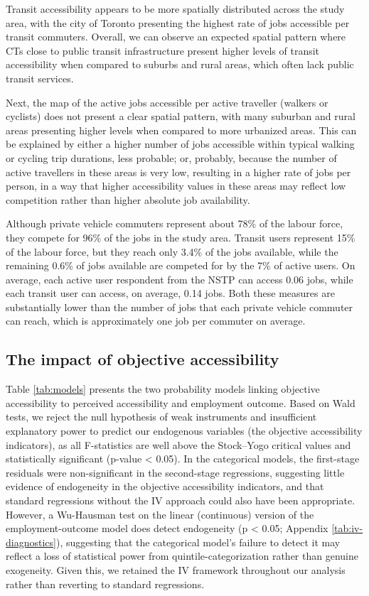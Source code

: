 \documentclass[preprint, 3p,
authoryear]{elsarticle} %
\begin{document}
Transit accessibility appears to be more spatially distributed across
the study area, with the city of Toronto presenting the highest rate of
jobs accessible per transit commuters. Overall, we can observe an
expected spatial pattern where CTs close to public transit
infrastructure present higher levels of transit accessibility when
compared to suburbs and rural areas, which often lack public transit
services.

Next, the map of the active jobs accessible per active traveller
(walkers or cyclists) does not present a clear spatial pattern, with
many suburban and rural areas presenting higher levels when compared to
more urbanized areas. This can be explained by either a higher number of
jobs accessible within typical walking or cycling trip durations, less
probable; or, probably, because the number of active travellers in these
areas is very low, resulting in a higher rate of jobs per person, in a
way that higher accessibility values in these areas may reflect low
competition rather than higher absolute job availability.

Although private vehicle commuters represent about 78\% of the labour
force, they compete for 96\% of the jobs in the study area. Transit
users represent 15\% of the labour force, but they reach only 3.4\% of
the jobs available, while the remaining 0.6\% of jobs available are
competed for by the 7\% of active users. On average, each active user
respondent from the NSTP can access 0.06 jobs, while each transit user
can access, on average, 0.14 jobs. Both these measures are substantially
lower than the number of jobs that each private vehicle commuter can
reach, which is approximately one job per commuter on average.

\subsection{The impact of objective
accessibility}\label{the-impact-of-objective-accessibility}

Table \ref{tab:models} presents the two probability models linking
objective accessibility to perceived accessibility and employment
outcome. Based on Wald tests, we reject the null hypothesis of weak
instruments and insufficient explanatory power to predict our endogenous
variables (the objective accessibility indicators), as all F-statistics
are well above the Stock--Yogo critical values and statistically
significant (p-value \textless{} 0.05). In the categorical models, the
first-stage residuals were non-significant in the second-stage
regressions, suggesting little evidence of endogeneity in the objective
accessibility indicators, and that standard regressions without the IV
approach could also have been appropriate. However, a Wu-Hausman test on
the linear (continuous) version of the employment-outcome model does
detect endogeneity (p \textless{} 0.05; Appendix
\ref{tab:iv-diagnostics}), suggesting that the categorical model's
failure to detect it may reflect a loss of statistical power from
quintile-categorization rather than genuine exogeneity. Given this, we
retained the IV framework throughout our analysis rather than reverting
to standard regressions.
\end{document}
